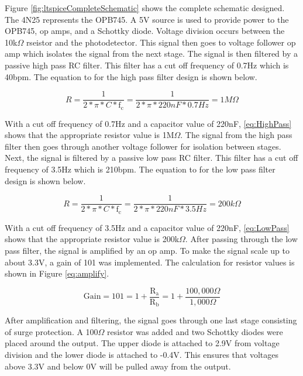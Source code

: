 \documentclass[CMPE]{KGCOEReport}
\begin{document}
Figure \ref{fig:ltspiceCompleteSchematic} shows the complete schematic designed. The 4N25 represents the OPB745. A 5V source is used to provide power to the OPB745, op amps, and a Schottky diode. Voltage division occurs between the 10k$\Omega$ rseistor and the photodetector. This signal then goes to voltage follower op amp which isolates the signal from the next stage. The signal is then filtered by a passive high pass RC filter. This filter has a cut off frequency of 0.7Hz which is 40bpm. The equation to for the high pass filter design is shown below.

\begin{equation}
R = \frac{1}{2*\pi*C*\text{f}_\text{c}} = \frac{1}{2*\pi*220nF*0.7Hz} = 1M\Omega \label{eq:HighPass}
\end{equation}

With a cut off frequency of 0.7Hz and a capacitor value of 220nF, \ref{eq:HighPass} shows that the appropriate resistor value is 1M$\Omega$. The signal from the high pass filter then goes through another voltage follower for isolation between stages. Next, the signal is filtered by a passive low pass RC filter. This filter has a cut off frequency of 3.5Hz which is 210bpm.  The equation to for the low pass filter design is shown below.

\begin{equation}
R = \frac{1}{2*\pi*C*\text{f}_\text{c}} = \frac{1}{2*\pi*220nF*3.5Hz} = 200k\Omega \label{eq:LowPass}
\end{equation}

With a cut off frequency of 3.5Hz and a capacitor value of 220nF, \ref{eq:LowPass} shows that the appropriate resistor value is 200k$\Omega$. After passing through the low pass filter, the signal is amplified by an op amp. To make the signal scale up to about 3.3V, a gain of 101 was implemented. The calculation for resistor values is shown in Figure \ref{eq:amplify}.

\begin{equation}
\text{Gain} = 101 = 1 + \frac{\text{R}_\text{a}}{\text{R}_\text{b}} = 1 + \frac{100,000\Omega}{1,000\Omega} \label{eq:amplify}
\end{equation}

After amplification and filtering, the signal goes through one last stage consisting of surge protection. A 100$\Omega$ resistor was added and two Schottky diodes were placed around the output. The upper diode is attached to 2.9V from voltage division and the lower diode is attached to -0.4V. This ensures that voltages above 3.3V and below 0V will be pulled away from the output.
\end{document}
